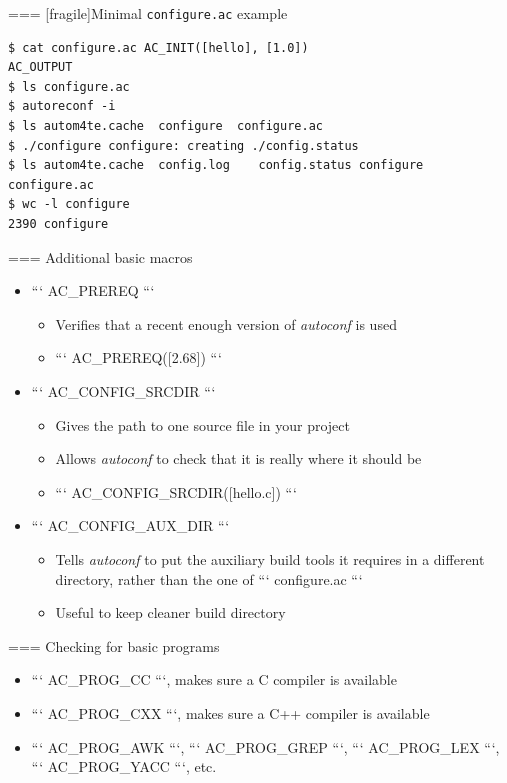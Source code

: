 === [fragile]{Minimal {\tt configure.ac} example}

  \begin{block}{}
    \begin{verbatim}
$ cat configure.ac AC_INIT([hello], [1.0])
AC_OUTPUT
$ ls configure.ac
$ autoreconf -i
$ ls autom4te.cache  configure  configure.ac
$ ./configure configure: creating ./config.status
$ ls autom4te.cache  config.log    config.status configure       configure.ac
$ wc -l configure
2390 configure
\end{verbatim}
\end{block}



=== {Additional basic macros}
  \begin{itemize}
  \item ``` AC_PREREQ ```
    \begin{itemize}
    \item Verifies that a recent enough version of {\em autoconf} is used
    \item ``` AC_PREREQ([2.68]) ```
    \end{itemize}
  \item ``` AC_CONFIG_SRCDIR ```
    \begin{itemize}
    \item Gives the path to one source file in your project
    \item Allows {\em autoconf} to check that it is really where it
      should be
    \item ``` AC_CONFIG_SRCDIR([hello.c]) ```
    \end{itemize}
  \item ``` AC_CONFIG_AUX_DIR ```
    \begin{itemize}
    \item Tells {\em autoconf} to put the auxiliary build tools it
      requires in a different directory, rather than the one of
      ``` configure.ac ```
    \item Useful to keep cleaner build directory
    \end{itemize}
  \end{itemize}


=== {Checking for basic programs}
  \begin{itemize}
  \item ``` AC_PROG_CC ```, makes sure a C compiler is available
  \item ``` AC_PROG_CXX ```, makes sure a C++ compiler is available
  \item ``` AC_PROG_AWK ```, ``` AC_PROG_GREP ```, ``` AC_PROG_LEX ```,
    ``` AC_PROG_YACC ```, etc.
  \end{itemize}



